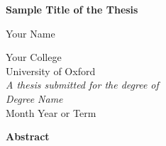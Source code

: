 \thispagestyle{empty}
\begin{alwayssingle}
    \begin{center}

    {\Large\bfseries Sample Title of the Thesis \par}
    {\large \vspace*{2ex} Your Name \par}
    {\large
        \vspace*{1ex}
        {Your College} \\
        {University of Oxford} \\
        \vspace*{1ex}
        {\it A thesis submitted for the degree of} \\
        {\it Degree Name} \\
        \vspace*{2ex}
        Month Year or Term \par
    }

        \vfill
        {\Large \bfseries Abstract}
    \end{center}

    \vspace{1ex}

    \setlength{\baselineskip}{0pt}

    \noindent
    

    \vfill
\end{alwayssingle}
\restoregeometry

\setlength{\baselineskip}{\textbaselineskip}